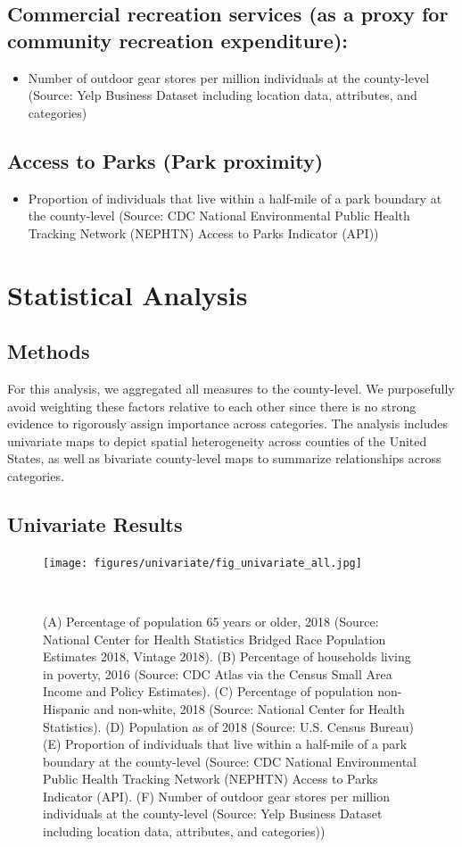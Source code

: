 \documentclass{article}
\begin{document}
\subsection{\textbf{Commercial recreation services (as a proxy for community recreation expenditure):}}
\begin{itemize}
\item Number of outdoor gear stores per million individuals at the county-level (Source: Yelp Business Dataset including location data, attributes, and categories)
\end{itemize}


\subsection{\textbf{Access to Parks (Park proximity)}}
\begin{itemize}
\item Proportion of individuals that live within a half-mile of a park boundary at the county-level (Source: CDC National Environmental Public Health Tracking Network (NEPHTN) Access to Parks Indicator (API))
\end{itemize}
\FloatBarrier

\section{\textbf{Statistical Analysis}}
\subsection{\textbf{Methods}}
For this analysis, we aggregated all measures to the county-level. We purposefully avoid weighting these factors relative to each other since there is no strong evidence to rigorously assign importance across categories. The analysis includes univariate maps to depict spatial heterogeneity across counties of the United States, as well as bivariate county-level maps to summarize relationships across categories. 

\subsection{\textbf{Univariate Results}}
\begin{figure}[!h] 
    \centering
    \texttt{[image: figures/univariate/fig\_univariate\_all.jpg]}
    \caption{(A) Percentage of population 65 years or older, 2018 (Source: National Center for Health Statistics Bridged Race Population Estimates 2018, Vintage 2018). (B) Percentage of households living in poverty, 2016 (Source: CDC Atlas via the Census Small Area Income and Policy Estimates). (C) Percentage of population non-Hispanic and non-white, 2018 (Source: National Center for Health Statistics). (D) Population as of 2018 (Source: U.S. Census Bureau) (E) Proportion of individuals that live within a half-mile of a park boundary at the county-level (Source: CDC National Environmental Public Health Tracking Network (NEPHTN) Access to Parks Indicator (API). (F) Number of outdoor gear stores per million individuals at the county-level (Source: Yelp Business Dataset including location data, attributes, and categories))}
    \
\end{figure}
\FloatBarrier
\end{document}
